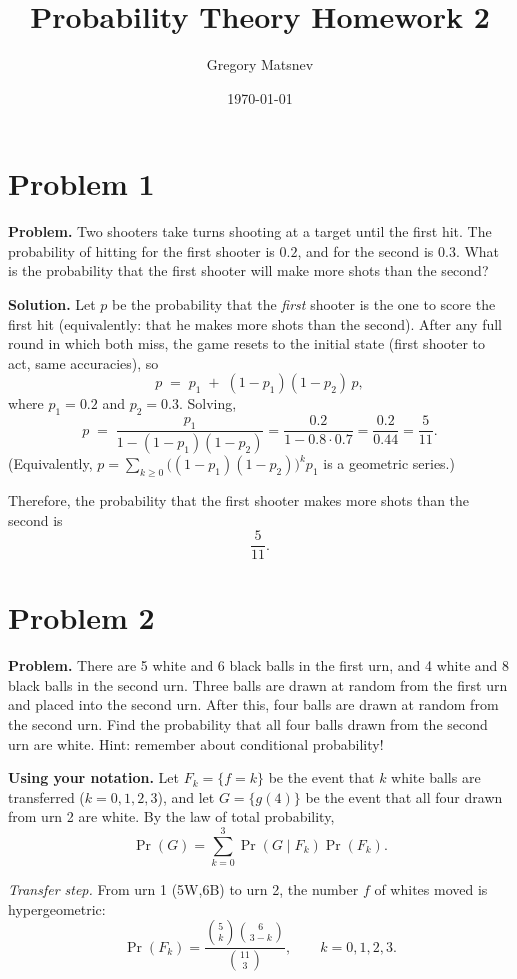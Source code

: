 \documentclass{article}
\title{Probability Theory Homework 2}
\author{Gregory Matsnev}
\date{\today}
\begin{document}
\maketitle

\section{Problem 1}

\textbf{Problem.} Two shooters take turns shooting at a target until the first hit. The probability of hitting for the first shooter is $0.2$, and for the second is $0.3$. What is the probability that the first shooter will make more shots than the second?

\textbf{Solution.}
Let $p$ be the probability that the \emph{first} shooter is the one to score the first hit (equivalently: that he makes more shots than the second). After any full round in which both miss, the game resets to the initial state (first shooter to act, same accuracies), so
\[
p \;=\; p_1 \;+\; (1-p_1)(1-p_2)\,p,
\]
where $p_1=0.2$ and $p_2=0.3$. Solving,
\[
p \;=\; \frac{p_1}{1-(1-p_1)(1-p_2)}
= \frac{0.2}{1-0.8\cdot0.7}
= \frac{0.2}{0.44}
= \frac{5}{11}.
\]
(Equivalently, \(p=\sum_{k\ge0}\bigl((1-p_1)(1-p_2)\bigr)^k p_1\) is a geometric series.)

Therefore, the probability that the first shooter makes more shots than the second is
\[
\boxed{\dfrac{5}{11}}.
\]

\section{Problem 2}

\textbf{Problem.} There are 5 white and 6 black balls in the first urn, and 4 white and 8 black balls in the second urn. Three balls are drawn at random from the first urn and placed into the second urn. After this, four balls are drawn at random from the second urn. Find the probability that all four balls drawn from the second urn are white. Hint: remember about conditional probability!

\textbf{Using your notation.}
Let $F_k=\{f=k\}$ be the event that $k$ white balls are transferred ($k=0,1,2,3$),
and let $G=\{g(4)\}$ be the event that all four drawn from urn 2 are white.
By the law of total probability,
\[
\Pr(G)=\sum_{k=0}^3 \Pr(G\mid F_k)\Pr(F_k).
\]

\textit{Transfer step.} From urn 1 (5W,6B) to urn 2, the number $f$ of whites moved is
hypergeometric:
\[
\Pr(F_k)=\frac{\binom{5}{k}\binom{6}{3-k}}{\binom{11}{3}},\qquad k=0,1,2,3.
\]
\end{document}
